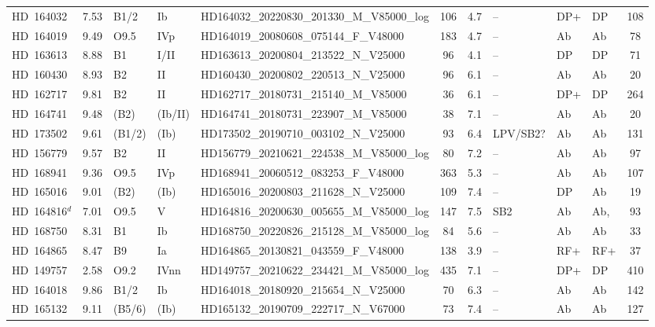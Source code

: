 {\begin{landscape}
\begin{longtable}{lclllcclllc}
 \noalign{\smallskip}
 \hline
 \endfoot
 \noalign{\smallskip}
HD~164032 & 7.53 & B1/2 & Ib & HD164032\_20220830\_201330\_M\_V85000\_log & 106 & 4.7 & -- & DP+ & DP & 108 \\
\noalign{\smallskip}
HD~164019 & 9.49 & O9.5 & IVp & HD164019\_20080608\_075144\_F\_V48000 & 183 & 4.7 & -- & Ab & Ab & 78 \\
\noalign{\smallskip}
HD~163613 & 8.88 & B1 & I/II & HD163613\_20200804\_213522\_N\_V25000 & 96 & 4.1 & -- & DP & DP & 71 \\
\noalign{\smallskip}
HD~160430 & 8.93 & B2 & II & HD160430\_20200802\_220513\_N\_V25000 & 96 & 6.1 & -- & Ab & Ab & 20 \\
\noalign{\smallskip}
HD~162717 & 9.81 & B2 & II & HD162717\_20180731\_215140\_M\_V85000 & 36 & 6.1 & -- & DP+ & DP & 264 \\
\noalign{\smallskip}
HD~164741 & 9.48 & (B2) & (Ib/II) & HD164741\_20180731\_223907\_M\_V85000 & 38 & 7.1 & -- & Ab & Ab & 20 \\
\noalign{\smallskip}
HD~173502 & 9.61 & (B1/2) & (Ib) & HD173502\_20190710\_003102\_N\_V25000 & 93 & 6.4 & LPV/SB2? & Ab & Ab & 131 \\
\noalign{\smallskip}
HD~156779 & 9.57 & B2 & II & HD156779\_20210621\_224538\_M\_V85000\_log & 80 & 7.2 & -- & Ab & Ab & 97 \\
\noalign{\smallskip}
HD~168941 & 9.36 & O9.5 & IVp & HD168941\_20060512\_083253\_F\_V48000 & 363 & 5.3 & -- & Ab & Ab & 107 \\
\noalign{\smallskip}
HD~165016 & 9.01 & (B2) & (Ib) & HD165016\_20200803\_211628\_N\_V25000 & 109 & 7.4 & -- & DP & Ab & 19 \\
\noalign{\smallskip}
HD~164816$^{d}$ & 7.01 & O9.5 & V & HD164816\_20200630\_005655\_M\_V85000\_log & 147 & 7.5 & SB2 & Ab & Ab, & 93 \\
\noalign{\smallskip}
HD~168750 & 8.31 & B1 & Ib & HD168750\_20220826\_215128\_M\_V85000\_log & 84 & 5.6 & -- & Ab & Ab & 33 \\
\noalign{\smallskip}
HD~164865 & 8.47 & B9 & Ia & HD164865\_20130821\_043559\_F\_V48000 & 138 & 3.9 & -- & RF+ & RF+ & 37 \\
\noalign{\smallskip}
HD~149757 & 2.58 & O9.2 & IVnn & HD149757\_20210622\_234421\_M\_V85000\_log & 435 & 7.1 & -- & DP+ & DP & 410 \\
\noalign{\smallskip}
HD~164018 & 9.86 & B1/2 & Ib & HD164018\_20180920\_215654\_N\_V25000 & 70 & 6.3 & -- & Ab & Ab & 142 \\
\noalign{\smallskip}
HD~165132 & 9.11 & (B5/6) & (Ib) & HD165132\_20190709\_222717\_N\_V67000 & 73 & 7.4 & -- & Ab & Ab & 127 \\

\end{longtable}
\end{landscape}}
